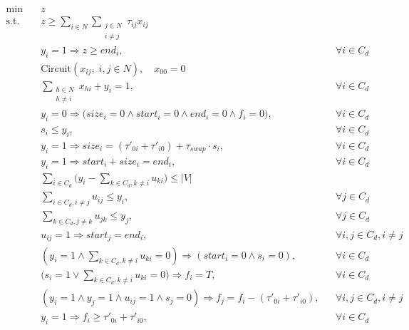 \documentclass[3p, authoryear, 11pt]{elsarticle}
\begin{document}
\begin{align}
    \text{min} \quad & z \label{eq:am_obj} \\
    \text{s.t.} \quad 
    & z \ge \sum_{i \in N} \sum_{\substack{j \in N\\ i \ne j}} \tau_{ij} x_{ij} \label{eq:am_truck_makespan} \\[3pt]
    & y_{i}=1 \Rightarrow z \ge end_{i}, && \forall i \in C_d \label{eq:am_drone_makespan} \\[3pt]
    & \text{Circuit}(x_{ij},\; i,j \in N), \quad x_{00} = 0 \label{eq:am_truck_circuit} \\[3pt]
    & \sum_{\substack{h \in N\\ h \neq i}} x_{hi} + y_{i} = 1, && \forall i \in C_d \label{eq:am_assignment} \\[6pt]
    & y_{i}=0 \Rightarrow \big(size_i = 0 \land start_i = 0 \land end_i = 0 \land f_i = 0 \big), && \forall i \in C_d \label{eq:am_not_served} \\[2pt]
    & s_{i} \le y_{i}, && \forall i \in C_d \label{eq:am_swap_logic} \\[2pt]
    & y_{i}=1 \Rightarrow size_{i} = (\tau'_{0i} + \tau'_{i0}) + \tau_{swap} \cdot s_{i}, && \forall i \in C_d \label{eq:am_size} \\[2pt]
    & y_{i}=1 \Rightarrow start_{i} + size_{i} = end_{i}, && \forall i \in C_d \label{eq:am_time_consistency} \\[6pt]
    & \sum_{i \in C_d} \Big( y_i - \sum_{k \in C_d, k \neq i} u_{ki} \Big) \le |V| \label{eq:am_fleet_size} \\[2pt]
    &\sum_{i \in C_d, i \neq j} u_{ij} \le y_{i}, && \forall j \in C_d \label{eq:am_flow_in} \\
    &\sum_{k \in C_d, j \neq k} u_{jk} \le y_{j}, && \forall j \in C_d \label{eq:am_flow_out} \\[2pt]
    & u_{ij} = 1 \Rightarrow start_{j} = end_{i}, && \forall i,j \in C_d, i \neq j \label{eq:am_precedence} \\[6pt]
    & (y_{i}=1 \land \sum_{k \in C_d, k \neq i} u_{ki} = 0) \Rightarrow (start_i = 0 \land s_i = 0), && \forall i \in C_d \label{eq:am_first_node_init} \\[2pt]
    & \Big(s_{i} = 1 \lor \sum_{k \in C_d, k \neq i} u_{ki} = 0 \Big) \Rightarrow f_{i} = T, && \forall i \in C_d \label{eq:am_reset} \\[2pt]
    & (y_i=1 \land y_j=1 \land u_{ij}=1 \land s_{j}=0) \Rightarrow f_{j} = f_{i} - (\tau'_{0i}+\tau'_{i0}), && \forall i,j \in C_d, i \neq j \label{eq:am_balance} \\[2pt]
    & y_{i}=1 \Rightarrow f_{i} \ge \tau'_{0i}+\tau'_{i0}, && \forall i \in C_d \label{eq:am_feasibility}
\end{align}
\end{document}
